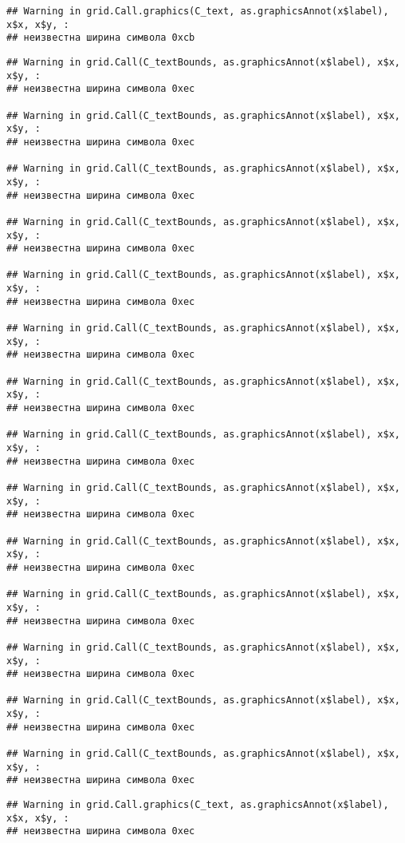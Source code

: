 \documentclass[
]{article}
\begin{document}
\begin{verbatim}
## Warning in grid.Call.graphics(C_text, as.graphicsAnnot(x$label), x$x, x$y, :
## неизвестна ширина символа 0xcb
\end{verbatim}

\begin{verbatim}
## Warning in grid.Call(C_textBounds, as.graphicsAnnot(x$label), x$x, x$y, :
## неизвестна ширина символа 0xec

## Warning in grid.Call(C_textBounds, as.graphicsAnnot(x$label), x$x, x$y, :
## неизвестна ширина символа 0xec

## Warning in grid.Call(C_textBounds, as.graphicsAnnot(x$label), x$x, x$y, :
## неизвестна ширина символа 0xec

## Warning in grid.Call(C_textBounds, as.graphicsAnnot(x$label), x$x, x$y, :
## неизвестна ширина символа 0xec

## Warning in grid.Call(C_textBounds, as.graphicsAnnot(x$label), x$x, x$y, :
## неизвестна ширина символа 0xec

## Warning in grid.Call(C_textBounds, as.graphicsAnnot(x$label), x$x, x$y, :
## неизвестна ширина символа 0xec

## Warning in grid.Call(C_textBounds, as.graphicsAnnot(x$label), x$x, x$y, :
## неизвестна ширина символа 0xec

## Warning in grid.Call(C_textBounds, as.graphicsAnnot(x$label), x$x, x$y, :
## неизвестна ширина символа 0xec

## Warning in grid.Call(C_textBounds, as.graphicsAnnot(x$label), x$x, x$y, :
## неизвестна ширина символа 0xec

## Warning in grid.Call(C_textBounds, as.graphicsAnnot(x$label), x$x, x$y, :
## неизвестна ширина символа 0xec

## Warning in grid.Call(C_textBounds, as.graphicsAnnot(x$label), x$x, x$y, :
## неизвестна ширина символа 0xec

## Warning in grid.Call(C_textBounds, as.graphicsAnnot(x$label), x$x, x$y, :
## неизвестна ширина символа 0xec

## Warning in grid.Call(C_textBounds, as.graphicsAnnot(x$label), x$x, x$y, :
## неизвестна ширина символа 0xec

## Warning in grid.Call(C_textBounds, as.graphicsAnnot(x$label), x$x, x$y, :
## неизвестна ширина символа 0xec
\end{verbatim}

\begin{verbatim}
## Warning in grid.Call.graphics(C_text, as.graphicsAnnot(x$label), x$x, x$y, :
## неизвестна ширина символа 0xec
\end{verbatim}
\end{document}
